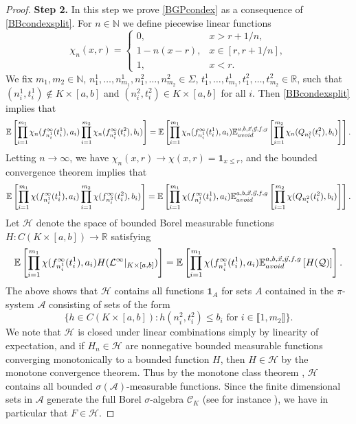 \begin{proof}
	\noindent\textbf{Step 2. } In this step we prove \eqref{BGPcondex} as a consequence of \eqref{BBcondexsplit}. For $n\in\mathbb{N}$ we define piecewise linear functions
	\[
	\chi_n(x,r) = \begin{cases}
		0, & x > r + 1/n,\\
		1-n(x-r), & x\in[r,r+1/n],\\
		1, & x < r.
	\end{cases}
	\]
	We fix $m_1,m_2\in\mathbb{N}$, $n^1_1,\dots,n^1_{m_1},n^2_1,\dots,n^2_{m_2}\in\Sigma$, $t^1_1,\dots,t^1_{m_1},t^2_1,\dots,t^2_{m_2}\in\mathbb{R}$, such that $(n^1_i,t^1_i)\notin K\times[a,b]$ and $(n^2_i,t^2_i)\in K\times[a,b]$ for all $i$. Then \eqref{BBcondexsplit} implies that
	\[
	\mathbb{E}\left[\prod_{i=1}^{m_1} \chi_n(f_{n_i^1}^\infty(t_i^1),a_i)\prod_{i=1}^{m_2}\chi_n(f_{n_i^2}^\infty(t_i^2),b_i)\right] = \mathbb{E}\left[\prod_{i=1}^{m_1} \chi_n(f_{n_i^1}^\infty(t_i^1),a_i)\mathbb{E}^{a,b,\vec{x},\vec{y},f,g}_{avoid}\left[\prod_{i=1}^{m_2} \chi_n(Q_{n_i^2}(t_i^2),b_i)\right]\right].
	\]
	Letting $n\to\infty$, we have $\chi_n(x,r)\to \chi(x,r)=\mathbf{1}_{x\leq r}$, and the bounded convergence theorem implies that
	\[
	\mathbb{E}\left[\prod_{i=1}^{m_1} \chi(f_{n_i^1}^\infty(t_i^1),a_i)\prod_{i=1}^{m_2}\chi(f_{n_i^2}^\infty(t_i^2),b_i)\right] = \mathbb{E}\left[\prod_{i=1}^{m_1} \chi(f_{n_i^1}^\infty(t_i^1),a_i)\mathbb{E}^{a,b,\vec{x},\vec{y},f,g}_{avoid}\left[\prod_{i=1}^{m_2} \chi(Q_{n_i^2}(t_i^2),b_i)\right]\right].
	\]
	Let $\mathcal{H}$ denote the space of bounded Borel measurable functions $H:C(K\times[a,b])\to\mathbb{R}$ satisfying
	\begin{equation}\label{BGPH}
		\mathbb{E}\left[\prod_{i=1}^{m_1} \chi(f_{n_i^1}^\infty(t_i^1),a_i)H(\mathcal{L}^\infty|_{K\times[a,b]})\right] = \mathbb{E}\left[\prod_{i=1}^{m_1} \chi(f_{n_i^1}^\infty(t_i^1),a_i)\mathbb{E}^{a,b,\vec{x},\vec{y},f,g}_{avoid}\left[H(\mathcal{Q})\right]\right].
	\end{equation}
	The above shows that $\mathcal{H}$ contains all functions $\mathbf{1}_A$ for sets $A$ contained in the $\pi$-system $\mathcal{A}$ consisting of sets of the form
	\[
	\{h\in C(K\times[a,b]) : h(n_i^2,t_i^2) \leq b_i \mbox{ for } i\in\llbracket 1,m_2\rrbracket\}.
	\]
	We note that $\mathcal{H}$ is closed under linear combinations simply by linearity of expectation, and if $H_n\in\mathcal{H}$ are nonnegative bounded measurable functions converging monotonically to a bounded function $H$, then $H\in\mathcal{H}$ by the monotone convergence theorem. Thus by the monotone class theorem \cite[Theorem 5.2.2]{Durrett}, $\mathcal{H}$ contains all bounded $\sigma(\mathcal{A})$-measurable functions. Since the finite dimensional sets in $\mathcal{A}$ generate the full Borel $\sigma$-algebra $\mathcal{C}_K$ (see for instance \cite[Lemma 3.1]{DimMat}), we have in particular that $F\in\mathcal{H}$.
	

\end{proof}
